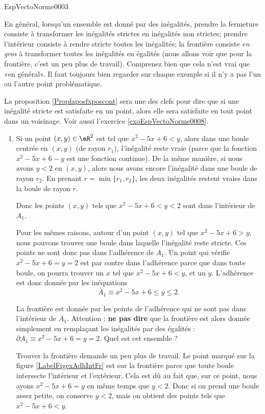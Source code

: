 \begin{corrige}{EspVectoNorme0003}

	En général, lorsqu'un ensemble est donné par des inégalités, prendre la fermeture consiste à transformer les inégalités strictes en inégalités non strictes; prendre l'intérieur consiste à rendre stricte toutes les inégalités; la frontière consiste \emph{en gros} à transformer toutes les inégalités en égalités (nous allons voir que pour la frontière, c'est un peu plus de travail). Comprenez bien que cela n'est vrai que «en général». Il faut toujours bien regarder sur chaque exemple si il n'y a pas l'un ou l'autre point problématique.

	La proposition \ref{Propfaposfxposcont} sera une des clefs pour dire que si une inégalité stricte est satisfaite en un point, alors elle sera satisfaite en tout point dans un voisinage. Voir aussi l'exercice \ref{exoEspVectoNorme0008}.
	\begin{enumerate}
		\item
			Si un point $(x,y)\in\eR^2$ est tel que $x^2-5x+6<y$, alors dans une boule centrée en $(x,y)$ (de rayon $r_1$), l'inégalité reste vraie (parce que la fonction $x^2-5x+6-y$ est une fonction continue). De la même manière, si nous avons $y<2$ en $(x,y)$, alors nous avons encore l'inégalité dans une boule de rayon $r_2$. En prenant $r=\min\{ r_1,r_2 \}$, les deux inégalités restent vraies dans la boule de rayon $r$.

			Donc les points $(x,y)$ tels que $x^2 - 5x + 6 < y < 2$ sont dans l'intérieur de $A_1$.
			
			Pour les mêmes raisons, autour d'un point $(x,y)$ tel que $x^2-5x+6>y$, nous pouvons trouver une boule dans laquelle l'inégalité reste stricte. Ces points ne sont donc pas dans l'adhérence de $A_1$. Un point qui vérifie $x^2-5x+6= y= 2$ est par contre dans l'adhérence parce que dans toute boule, on pourra trouver un $x$ tel que $x^2-5x+6<y$, et un $y$. L'adhérence est donc donnée par les inéquations
			\begin{equation}
				\bar A_1\equiv x^2-5x+6\leq y\leq 2.
			\end{equation}
			
			La frontière est donnée par les points de l'adhérence qui ne sont pas dans l'intérieur de $A_1$. Attention : {\bf ne pas dire} que la frontière est alors donnée simplement en remplaçant les inégalités par des égalités : $\partial A_1\equiv x^2-5x+6= y= 2$. Quel est cet ensemble ?

			Trouver la frontière demande un peu plus de travail. Le point marqué sur la figure \ref{LabelFigexAdhIntFr} est sur la frontière parce que toute boule intersecte l'intérieur et l'extérieur. Cela est dû au fait que, sur ce point, nous ayons $x^2-5x+6=y$ en même temps que $y<2$. Donc si on prend une boule assez petite, on conserve $y<2$, mais on obtient des points tels que $x^2-5x+6<y$. 


\end{enumerate}
\end{corrige}

